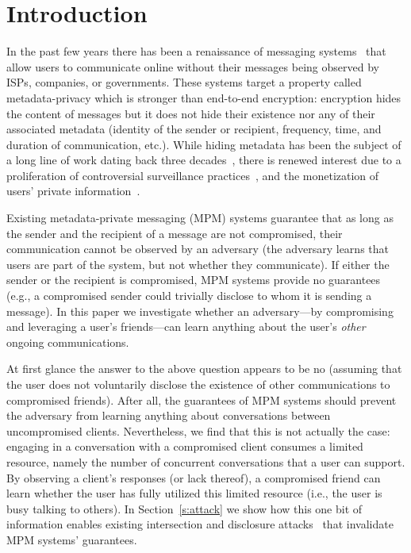 \section{Introduction}\label{s:intro}

In the past few years there has been a renaissance of messaging
  systems~\cite{angel16unobservable, vandenhoof15vuvuzela, lazar16alpenhorn, 
  kwon17atom, tyagi17stadium, alexopoulos17mcmix} that allow users to 
  communicate online without their messages being observed by ISPs, companies, 
  or governments.
These systems target a property called metadata-privacy which is
  stronger than end-to-end encryption: encryption hides the content of 
  messages but it does not hide their existence nor any of their associated 
  metadata (identity of the sender or recipient, frequency, time,
  and duration of communication, etc.).
While hiding metadata has been the subject of a long line of work 
  dating back three decades~\cite{chaum81untraceable}, there is renewed 
  interest due to a proliferation of controversial surveillance 
  practices~\cite{guardian13nsa, intercept14new, guardian15gchq,
  eff15dragnet, tor15cmu}, and the monetization of users' private 
  information~\cite{wired12shady, cnet12facebook, forbes13att, reuters16yahoo}.

Existing metadata-private messaging (MPM) systems guarantee that as 
  long as the sender and the recipient of a message are not compromised, their 
  communication cannot be observed by an adversary (the adversary 
  learns that users are part of the system, but not whether they communicate).
If either the sender or the recipient is compromised, MPM systems
  provide no guarantees (e.g., a compromised sender could trivially 
  disclose to whom it is sending a message).
In this paper we investigate whether an adversary---by 
  compromising and leveraging a user's friends---can learn anything about 
  the user's \emph{other} ongoing communications.

At first glance the answer to the above question appears to be no (assuming 
  that the user does not voluntarily disclose the existence of other 
  communications to compromised friends).
After all, the guarantees of MPM systems 
  should prevent the adversary from learning anything about 
  conversations between uncompromised clients.
Nevertheless, we find that this is not actually the case: engaging in 
  a conversation with a compromised client consumes a limited resource, namely
  the number of concurrent conversations that a user can support.
By observing a client's responses (or lack thereof), a compromised friend can 
  learn whether the user has fully utilized this limited resource (i.e., the 
  user is busy talking to others).
In Section~\ref{s:attack} we show how this one bit of information enables 
  existing intersection and disclosure attacks~\cite{raymond00traffic, agrawal03disclosure, 
  kesdogan04hitting, kesdogan09breaking, danezis03statistical, mallesh10reverse, 
  troncoso08perfect,danezis09vida, danezis04statistical, danezis07two, 
  perezgonzales12understanding} that
  invalidate MPM systems' guarantees.


